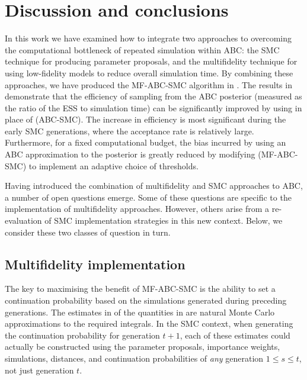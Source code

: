 \documentclass[12pt, onecolumn]{article}
\begin{document}
\section{Discussion and conclusions}
\label{s:Discussion}

In this work we have examined how to integrate two approaches to overcoming the computational bottleneck of repeated simulation within ABC: 
the SMC technique for producing parameter proposals,
and the multifidelity technique for using low-fidelity models to reduce overall simulation time.
By combining these approaches, we have produced the MF-ABC-SMC algorithm in .
The results in  demonstrate that the efficiency of sampling from the ABC posterior (measured as the ratio of the ESS to simulation time) can be significantly improved by using  in place of  (ABC-SMC).
The increase in efficiency is most significant during the early SMC generations, where the acceptance rate is relatively large.
Furthermore, for a fixed computational budget, the bias incurred by using an ABC approximation to the posterior is greatly reduced by modifying  (MF-ABC-SMC) to implement an adaptive choice of thresholds.

Having introduced the combination of multifidelity and SMC approaches to ABC, a number of open questions emerge.
Some of these questions are specific to the implementation of multifidelity approaches.
However, others arise from a re-evaluation of SMC implementation strategies in this new context.
Below, we consider these two classes of question in turn.

\subsection{Multifidelity implementation}

The key to maximising the benefit of MF-ABC-SMC is the ability to set a continuation probability based on the simulations generated during preceding generations.
The estimates in  of the quantities in  are natural Monte Carlo approximations to the required integrals.
In the SMC context, when generating the continuation probability for generation $t+1$, each of these estimates could actually be constructed using the parameter proposals, importance weights, simulations, distances, and continuation probabilities of \emph{any} generation $1 \leq s \leq t$, not just generation $t$.
\end{document}
